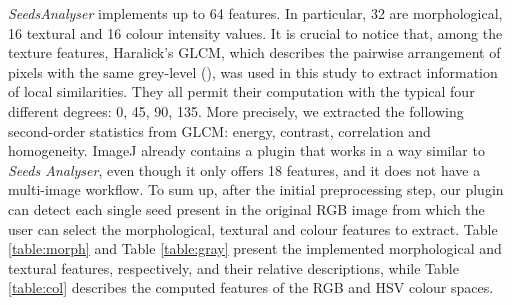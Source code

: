 \documentclass[twocolumn]{svjour3}           %
\begin{document}
\emph{SeedsAnalyser} implements up to 64 features. In particular, 32 are morphological, 16 textural and 16 colour intensity values. It is crucial to notice that, among the texture features, Haralick's GLCM, which describes the pairwise arrangement of pixels with the same grey-level (\cite{Haralick73}), was used in this study to extract information of local similarities. They all permit their computation with the typical four different degrees: 0\degree, 45\degree, 90\degree, 135\degree. More precisely, we extracted the following second-order statistics from GLCM: energy, contrast, correlation and homogeneity.
ImageJ already contains a plugin that works in a way similar to \emph{Seeds Analyser}, even though it only offers 18 features, and it does not have a multi-image workflow.
To sum up, after the initial preprocessing step, our plugin can detect each single seed present in the original RGB image from which the user can select the morphological, textural and colour features to extract. Table \ref{table:morph} and Table \ref{table:gray} present the implemented morphological and textural features, respectively, and their relative descriptions, while Table \ref{table:col} describes the computed features of the RGB and HSV colour spaces.
\end{document}
